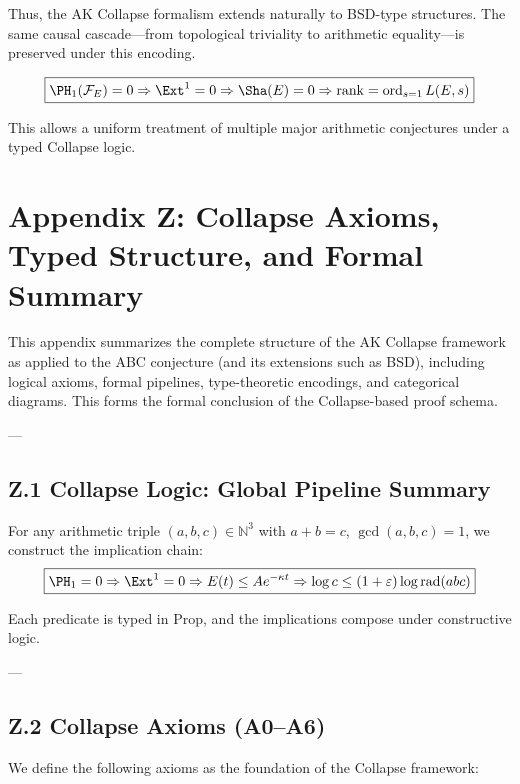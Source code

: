 \documentclass[11pt]{article}
\begin{document}
Thus, the AK Collapse formalism extends naturally to BSD-type structures.  
The same causal cascade—from topological triviality to arithmetic equality—is preserved under this encoding.

\[
\boxed{
\PH_1(\mathcal{F}_E) = 0 \Rightarrow \Ext^1 = 0 \Rightarrow \Sha(E) = 0 \Rightarrow \operatorname{rank} = \operatorname{ord}_{s=1} L(E,s)
}
\]

This allows a uniform treatment of multiple major arithmetic conjectures under a typed Collapse logic.



\section*{Appendix Z: Collapse Axioms, Typed Structure, and Formal Summary}

This appendix summarizes the complete structure of the AK Collapse framework as applied to the ABC conjecture  
(and its extensions such as BSD), including logical axioms, formal pipelines, type-theoretic encodings, and categorical diagrams.  
This forms the formal conclusion of the Collapse-based proof schema.

---

\subsection*{Z.1 Collapse Logic: Global Pipeline Summary}

For any arithmetic triple \( (a,b,c) \in \mathbb{N}^3 \) with \( a + b = c \), \( \gcd(a,b,c) = 1 \), we construct the implication chain:
\[
\boxed{
\PH_1 = 0 \Rightarrow \Ext^1 = 0 \Rightarrow E(t) \leq Ae^{-\kappa t} \Rightarrow \log c \leq (1+\varepsilon)\log \mathrm{rad}(abc)
}
\]

Each predicate is typed in \( \mathrm{Prop} \), and the implications compose under constructive logic.

---

\subsection*{Z.2 Collapse Axioms (A0–A6)}

We define the following axioms as the foundation of the Collapse framework:
\end{document}
